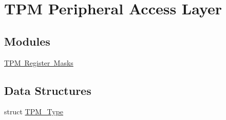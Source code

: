 \hypertarget{group___t_p_m___peripheral___access___layer}{}\section{T\+PM Peripheral Access Layer}
\label{group___t_p_m___peripheral___access___layer}
\subsection*{Modules}
\begin{DoxyCompactItemize}
\item 
\mbox{\hyperlink{group___t_p_m___register___masks}{T\+P\+M Register Masks}}
\end{DoxyCompactItemize}
\subsection*{Data Structures}
\begin{DoxyCompactItemize}
\item 
struct \mbox{\hyperlink{struct_t_p_m___type}{T\+P\+M\+\_\+\+Type}}
\end{DoxyCompactItemize}

